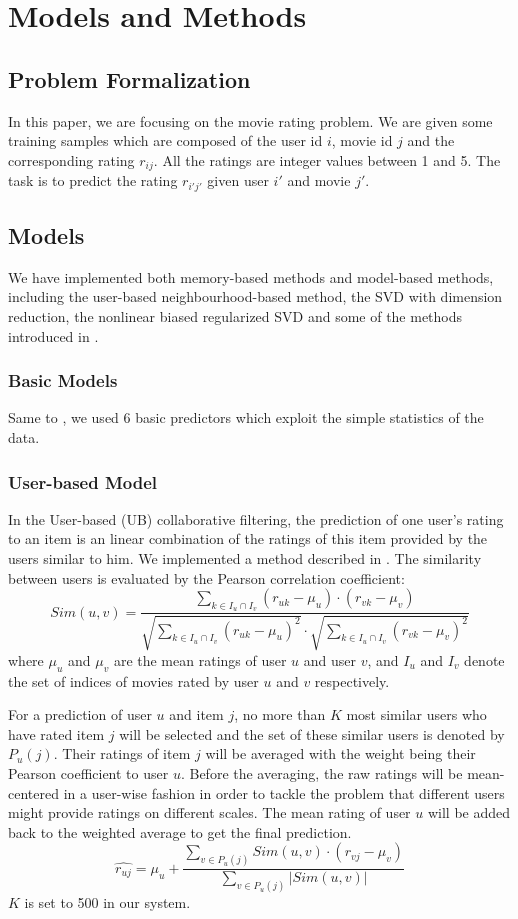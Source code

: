 \documentclass[10pt,conference,compsocconf]{IEEEtran}
\begin{document}
\section{Models and Methods}
\subsection{Problem Formalization}
In this paper, we are focusing on the movie rating problem. We are given some training samples which are composed of the user id $i$, movie id $j$ and the corresponding rating $r_{ij}$. All the ratings are integer values between 1 and 5. The task is to predict the rating $r_{i'j'}$ given user $i'$ and movie $j'$.

\subsection{Models}
We have implemented both memory-based methods and model-based methods, including the user-based neighbourhood-based method, the SVD with dimension reduction, the nonlinear biased regularized SVD and some of the methods introduced in \cite{Paterek2007Improving}.
\subsubsection{Basic Models}
Same to \cite{Paterek2007Improving}, we used 6 basic predictors which exploit the simple statistics of the data.

\subsubsection{User-based Model}
In the User-based (UB) collaborative filtering, the prediction of one user's rating to an item is an linear combination of the ratings of this item provided by the users similar to him. We implemented a method described in \cite{Aggarwal2016Neighborhood}. The similarity between users is evaluated by the Pearson correlation coefficient:
$$Sim(u,v) = \frac{{\sum\limits_{k \in {I_u} \cap {I_v}} {({r_{uk}} - {\mu _u}) \cdot ({r_{vk}} - {\mu _v})} }}{{\sqrt {\sum\limits_{k \in {I_u} \cap {I_v}} {{{({r_{uk}} - {\mu _u})}^2}} }  \cdot \sqrt {\sum\limits_{k \in {I_u} \cap {I_v}} {{{({r_{vk}} - {\mu _v})}^2}} } }}$$
where $\mu _u$ and $\mu _v$ are the mean ratings of user $u$ and user $v$, and ${I_u}$ and ${I_v}$ denote the set of indices of movies rated by user $u$ and $v$ respectively.

For a prediction of user $u$ and item $j$, no more than $K$ most similar users who have rated item $j$ will be selected and the set of these similar users is denoted by ${P_u}(j)$. Their ratings of item $j$ will be averaged with the weight being their Pearson coefficient to user $u$. Before the averaging, the raw ratings will be mean-centered in a user-wise fashion in order to tackle the problem that different users might provide ratings on different scales. The mean rating of user $u$ will be added back to the weighted average to get the final prediction.
$${\hat {r_{uj}}} = {\mu _u} + \frac{{\sum\limits_{v \in {P_u}(j)} {Sim(u,v) \cdot ({r_{vj}} - {\mu _v})} }}{{\sum\limits_{v \in {P_u}(j)} {\left| {Sim(u,v)} \right|} }}$$
$K$ is set to 500 in our system.
\end{document}
